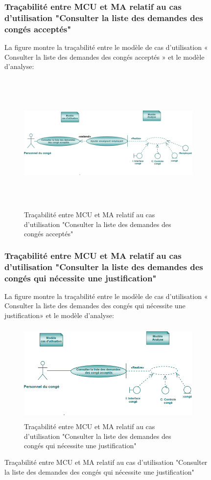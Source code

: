 \documentclass[12 pt]{report}
\begin{document}
\begin{figure}[h]
\begin{center}
\subsubsection{Traçabilité entre MCU et MA relatif au cas d’utilisation "Consulter la liste des demandes des congés acceptés"}
La figure  montre la traçabilité entre le modèle de cas d’utilisation « Consulter la liste des demandes des congés acceptés » et le modèle d’analyse:
\begin{figure}[h]
\begin{center}
\includegraphics[width= 14cm , height =7cm]{tra_con_con_acc.PNG}
\caption{Traçabilité entre MCU et MA relatif au cas d’utilisation "Consulter la liste des demandes des congés acceptés"}
\end{center}
\end{figure}
\newpage
\subsubsection{Traçabilité entre MCU et MA relatif au cas d’utilisation "Consulter la liste des demandes des congés qui nécessite une justification" }
La figure  montre la traçabilité entre le modèle de cas d’utilisation « Consulter la liste des demandes des congés qui nécessite une justification» et le modèle d’analyse:
\begin{figure}[h]
\begin{center}
\includegraphics[width= 12cm , height =5cm]{tra_con_con_jus.PNG}
\caption{Traçabilité entre MCU et MA relatif au cas d’utilisation "Consulter la liste des demandes des congés qui nécessite une justification"}
\end{center}
\end{figure}

\end{center}
\end{figure}
\end{document}
